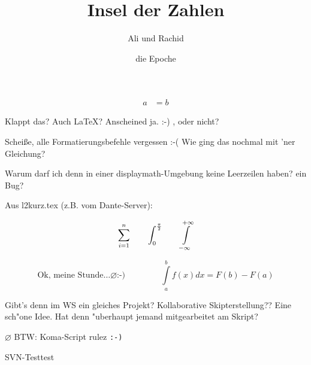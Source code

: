\documentclass{scrartcl}
\title{Insel der Zahlen}
\author{Ali und Rachid}
\date{die Epoche}
\begin{document}

\maketitle

\begin{align}
a&=b
\end{align}

Klappt das? Auch \LaTeX{}? Anscheined ja. :-) , oder nicht?

Scheiße, alle Formatierungsbefehle vergessen :-(
\newline
Wie ging das nochmal mit 'ner Gleichung?

Warum darf ich denn in einer displaymath-Umgebung keine Leerzeilen haben? ein Bug?

Aus l2kurz.tex (z.B. vom Dante-Server):

\begin{displaymath}
\sum_{i=1}^{n} \qquad
\int_{0}^{\frac{\pi}{2}} \qquad
\int \limits_{-\infty}^{+\infty}\\
\end{displaymath}

\begin{displaymath}
\textrm{Ok, meine Stunde}\ldots \varnothing \texttt{:-)} \qquad \  \qquad
\int \limits_{a}^{b} f(x) d x = F(b) - F(a)
\end{displaymath}

Gibt's denn im WS ein gleiches Projekt? Kollaborative Skipterstellung?? Eine sch"one Idee. Hat denn "uberhaupt jemand mitgearbeitet am Skript?

$ \varnothing $
BTW: Koma-Script rulez \texttt{:-)}

\begin{xy}
\end{xy}

SVN-Testtest
\end{document}
